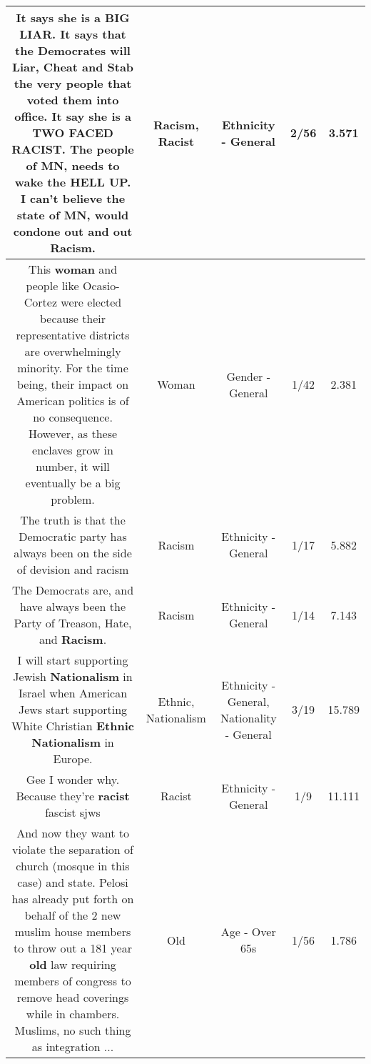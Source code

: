 \documentclass[11pt]{article}
\newlength\mylength
\begin{document}
\begin{center}
\begin{longtable}{|C{.65\mylength}|C{.30\mylength}|C{.12\mylength}|C{.12\mylength}|C{.12\mylength}|}
  \small It says she is a BIG LIAR. It says that the Democrates will Liar, Cheat and Stab the very people that voted them into office. It say she is a TWO FACED \textbf{RACIST}. The people of MN, needs to wake the HELL UP. I can't believe the state of MN, would condone out and out \textbf{Racism}.\normalsize   & Racism, Racist & Ethnicity - General & 2/56 & 3.571 \\  \hline
  \small This \textbf{woman} and people like Ocasio-Cortez were elected because their representative districts are overwhelmingly minority. For the time being, their impact on American politics is of no consequence. However, as these enclaves grow in number, it will eventually be a big problem.\normalsize   & Woman & Gender - General & 1/42 & 2.381 \\  \hline
  \small The truth is that the Democratic party has always been on the side of devision and racism\normalsize   & Racism & Ethnicity - General & 1/17 & 5.882 \\  \hline
  \small The Democrats are, and have always been the Party of Treason, Hate, and \textbf{Racism}.\normalsize   & Racism & Ethnicity - General & 1/14 & 7.143 \\  \hline
  \small I will start supporting Jewish \textbf{Nationalism} in Israel when American Jews start supporting White Christian \textbf{Ethnic} \textbf{Nationalism} in Europe.\normalsize   & Ethnic, Nationalism & Ethnicity - General, Nationality - General & 3/19 & 15.789 \\  \hline
  \small Gee I wonder why.  Because they're \textbf{racist} fascist sjws\normalsize   & Racist & Ethnicity - General & 1/9 & 11.111 \\  \hline
  \small And now they want to violate the separation of church (mosque in this case) and state. Pelosi has already put forth on behalf of the 2 new muslim house members to throw out a 181 year \textbf{old} law requiring members of congress to remove head coverings while in chambers. Muslims, no such thing as integration ...\normalsize   & Old & Age - Over 65s & 1/56 & 1.786 \\  \hline

\end{longtable}
\end{center}
\end{document}
